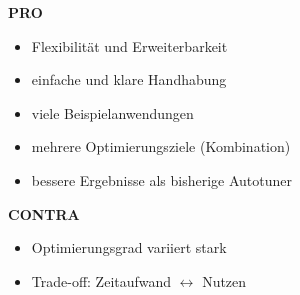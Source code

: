   
  \begin{frame}
  
   \textbf{PRO\\}
   \begin{itemize}
      \item Flexibilität und Erweiterbarkeit

      \item einfache und klare Handhabung
      
      \item viele Beispielanwendungen
      
      \item mehrere Optimierungsziele (Kombination)

      \item bessere Ergebnisse als bisherige Autotuner
        
     \end{itemize}

    \text{} %
      
   \textbf{CONTRA\\}
    \begin{itemize}
      \item Optimierungsgrad variiert stark
      
      \item Trade-off: Zeitaufwand $\leftrightarrow$ Nutzen
      \end{itemize}
    
  \end{frame}
  
  
\begingroup
{}

